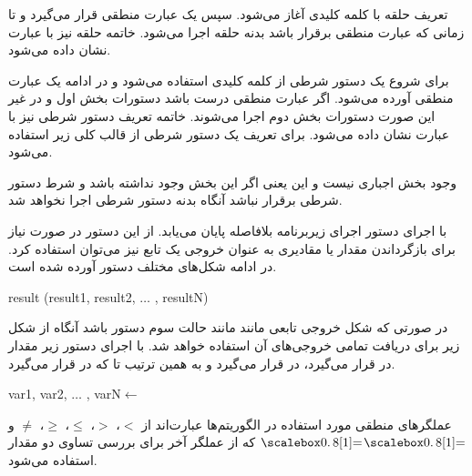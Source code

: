 تعریف حلقه {} با کلمه کلیدی {} آغاز می‌شود. سپس یک عبارت منطقی قرار می‌گیرد و تا زمانی که عبارت منطقی برقرار باشد بدنه حلقه اجرا می‌شود. خاتمه حلقه {} نیز با عبارت {} نشان داده می‌شود.
\begin{latin}
\begin{algorithmic}[1]
	\State	{}
\EndWhile
\end{algorithmic}
\end{latin}

برای شروع یک دستور شرطی از کلمه کلیدی {} استفاده می‌شود و در ادامه یک عبارت منطقی آورده می‌شود. اگر عبارت منطقی درست باشد دستورات بخش اول و در غیر این صورت دستورات بخش دوم اجرا می‌شوند. خاتمه تعریف دستور شرطی نیز با  عبارت {} نشان داده می‌شود. برای تعریف یک دستور شرطی از قالب کلی زیر استفاده می‌شود.
\begin{latin}
\begin{algorithmic}[1]
	\State	{}
\Else
	\State	{}
\EndIf
\end{algorithmic}
\end{latin}
وجود بخش {} اجباری نیست و این یعنی اگر این بخش وجود نداشته باشد و شرط دستور شرطی برقرار نباشد آنگاه بدنه دستور شرطی اجرا نخواهد شد.

با اجرای دستور {} اجرای زیربرنامه بلافاصله پایان می‌یابد. از این دستور در صورت نیاز برای بازگرداندن مقدار یا مقادیری به عنوان خروجی یک تابع نیز می‌توان استفاده کرد. در ادامه شکل‌های مختلف دستور {} آورده شده است.
\begin{latin}
\begin{algorithmic}[1]
\State	\Return
\State	\Return result
\State	\Return (result1, result2, $\ldots$ , resultN)
\end{algorithmic}
\end{latin}
در صورتی که شکل خروجی تابعی مانند {} مانند حالت سوم دستور {} باشد آنگاه از شکل زیر برای دریافت تمامی خروجی‌های آن استفاده خواهد شد. با اجرای دستور زیر مقدار {} در {} قرار می‌گیرد، {} در {} قرار می‌گیرد و به همین ترتیب تا {} که در {} قرار می‌گیرد.
\begin{latin}
\begin{algorithmic}[1]
\State	var1, var2, $\ldots$ , varN$\gets$
\end{algorithmic}
\end{latin}
عملگرهای منطقی مورد استفاده در الگوریتم‌ها عبارت‌اند از {$<$}، {$>$}، {$\leq$}، {$\geq$}، {$\neq$} و {$\isequal$} که از عملگر آخر برای بررسی تساوی دو مقدار استفاده می‌شود.

